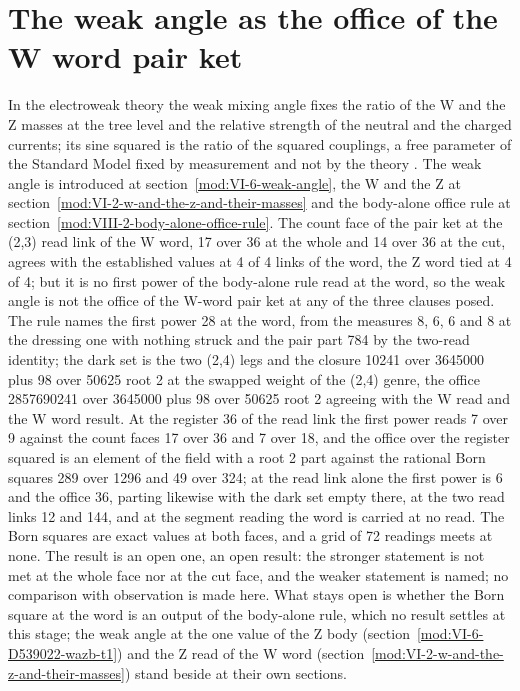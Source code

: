 \section{The weak angle as the office of the W word pair ket}\label{mod:VI-6-D539645-w-wbsq}
In the electroweak theory the weak mixing angle fixes the ratio of the W and the Z masses at the tree level and the relative strength of the neutral and the charged currents; its sine squared is the ratio of the squared couplings, a free parameter of the Standard Model fixed by measurement and not by the theory \cite{Glashow1961,Weinberg1967,Salam1968}. The weak angle is introduced at section~\ref{mod:VI-6-weak-angle}, the W and the Z at section~\ref{mod:VI-2-w-and-the-z-and-their-masses} and the body-alone office rule at section~\ref{mod:VIII-2-body-alone-office-rule}.
The count face of the pair ket at the (2,3) read link of the W word, 17 over 36 at the whole and 14 over 36 at the cut, agrees with the established values at 4 of 4 links of the word, the Z word tied at 4 of 4; but it is no first power of the body-alone rule read at the word, so the weak angle is not the office of the W-word pair ket at any of the three clauses posed.
The rule names the first power 28 at the word, from the measures 8, 6, 6 and 8 at the dressing one with nothing struck and the pair part 784 by the two-read identity; the dark set is the two (2,4) legs and the closure 10241 over 3645000 plus 98 over 50625 root 2 at the swapped weight of the (2,4) genre, the office 2857690241 over 3645000 plus 98 over 50625 root 2 agreeing with the W read and the W word result. At the register 36 of the read link the first power reads 7 over 9 against the count faces 17 over 36 and 7 over 18, and the office over the register squared is an element of the field with a root 2 part against the rational Born squares 289 over 1296 and 49 over 324; at the read link alone the first power is 6 and the office 36, parting likewise with the dark set empty there, at the two read links 12 and 144, and at the segment reading the word is carried at no read. The Born squares are exact values at both faces, and a grid of 72 readings meets at none.
The result is an open one, an open result: the stronger statement is not met at the whole face nor at the cut face, and the weaker statement is named; no comparison with observation is made here.
What stays open is whether the Born square at the word is an output of the body-alone rule, which no result settles at this stage; the weak angle at the one value of the Z body (section~\ref{mod:VI-6-D539022-wazb-t1}) and the Z read of the W word (section~\ref{mod:VI-2-w-and-the-z-and-their-masses}) stand beside at their own sections.
\par\medskip{}\label{narr:close:6-6}\par
